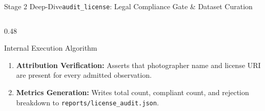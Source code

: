\begin{frame}{Stage 2 Deep-Dive}{\texttt{audit\_license}: Legal Compliance Gate \& Dataset Curation}
\begin{columns}[T]
\begin{column}{0.48\textwidth}
\begin{block}{Internal Execution Algorithm}
\begin{enumerate}
                        $$\mathcal{L}_{\text{allowed}} = \{\text{CC0}, \text{CC-BY}, \text{CC-BY-NC}\}$$
                    \item \textbf{Attribution Verification:} Asserts that photographer name and license URI are present for every admitted observation.
                    \item \textbf{Metrics Generation:} Writes total count, compliant count, and rejection breakdown to \texttt{reports/license\_audit.json}.
                \end{enumerate}
            \end{block}
        \end{column}
    \end{columns}


\end{frame}

